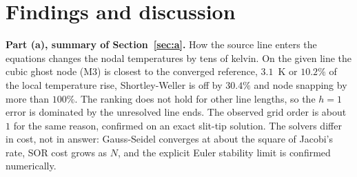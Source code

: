 \section{Findings and discussion}

\textbf{Part (a), summary of Section~\ref{sec:a}.} How the source line enters the equations changes the nodal temperatures by
tens of kelvin. On the given line the cubic ghost node (M3) is closest to the converged reference, $3.1$~K or $10.2\%$ of the local
temperature rise, Shortley-Weller is off by $30.4\%$ and node snapping by more than $100\%$. The ranking does not hold for other
line lengths, so the $h=1$ error is dominated by the unresolved line ends. The observed grid order is about $1$ for the same
reason, confirmed on an exact slit-tip solution. The solvers differ in cost, not in answer: Gauss-Seidel converges at about the
square of Jacobi's rate, SOR cost grows as $N$, and the explicit Euler stability limit is confirmed numerically.

